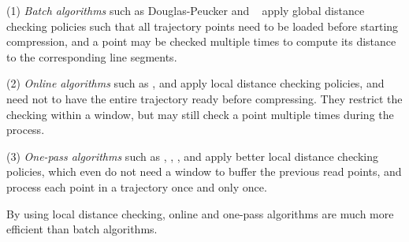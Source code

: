 \sstab (1) {\em Batch algorithms} such as Douglas-Peucker\cite{Douglas:Peucker,Meratnia:Spatiotemporal} and \pavlidis~\cite{Pavlidis:Segment} apply global distance checking policies such that all trajectory points need to be loaded before starting compression, and a point may be checked multiple times to compute its distance to the corresponding line segments.

\sstab (2) {\em Online algorithms} such as \opwa \cite{Meratnia:Spatiotemporal}, \squishe \cite{Muckell:SQUISH} and \bqsa \cite{Liu:BQS} apply local distance checking policies, and need not to have the entire trajectory ready before compressing. They restrict the checking within a window, but may still check a point  multiple times during the process.

\sstab (3) {\em One-pass algorithms} such as \operb\cite{Lin:Operb}, \siped \cite{Williams:Longest,Sklansky:Cone,Dunham:Cone, Zhao:Sleeve}, \cised \cite{Lin:Cised}, \intersec\cite{Long:Direction} and \interval \cite{Ke:Interval} apply better local distance checking policies, which even do not need a window to buffer the previous read points, and process each point in a trajectory once and only once.

By using local distance checking, online and one-pass algorithms are much more efficient than batch algorithms.




